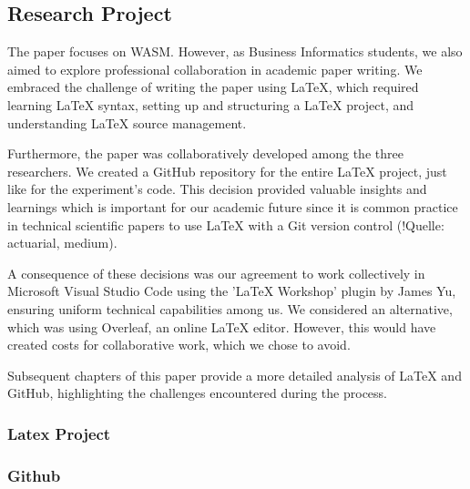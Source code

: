 \subsection{Research Project} \label{research_project}
    The paper focuses on WASM. However, as Business Informatics students, we also aimed to explore professional collaboration in academic paper writing. We embraced the challenge of writing the paper using LaTeX, which required learning LaTeX syntax, setting up and structuring a LaTeX project, and understanding LaTeX source management.

    Furthermore, the paper was collaboratively developed among the three researchers. We created a GitHub repository for the entire LaTeX project, just like for the experiment's code. This decision provided valuable insights and learnings which is important for our academic future since it is common practice in technical scientific papers to use LaTeX with a Git version control (!Quelle: actuarial, medium).

    A consequence of these decisions was our agreement to work collectively in Microsoft Visual Studio Code using the 'LaTeX Workshop' plugin by James Yu, ensuring uniform technical capabilities among us. We considered an alternative, which was using Overleaf, an online LaTeX editor. However, this would have created costs for collaborative work, which we chose to avoid.

    Subsequent chapters of this paper provide a more detailed analysis of LaTeX and GitHub, highlighting the challenges encountered during the process.
\subsubsection{Latex Project} \label{latex_project}

\subsubsection{Github} \label{github}






